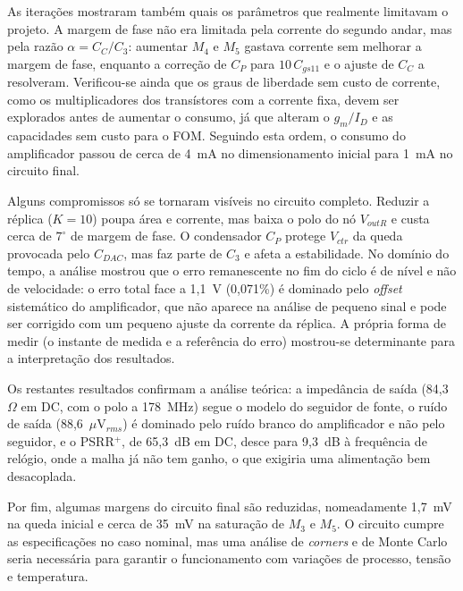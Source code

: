 As iterações mostraram também quais os parâmetros que realmente limitavam o projeto. A margem de fase não era limitada
pela corrente do segundo andar, mas pela razão $\alpha = C_C/C_3$: aumentar $M_4$ e $M_5$ gastava corrente sem melhorar a
margem de fase, enquanto a correção de $C_P$ para $10\,C_{gs11}$ e o ajuste de $C_C$ a resolveram. Verificou-se ainda que
os graus de liberdade sem custo de corrente, como os multiplicadores dos transístores com a corrente fixa, devem ser
explorados antes de aumentar o consumo, já que alteram o $g_m/I_D$ e as capacidades sem custo para o FOM. Seguindo esta
ordem, o consumo do amplificador passou de cerca de 4~mA no dimensionamento inicial para 1~mA no circuito final.

Alguns compromissos só se tornaram visíveis no circuito completo. Reduzir a réplica ($K = 10$) poupa área e corrente, mas
baixa o polo do nó $V_{outR}$ e custa cerca de $7^\circ$ de margem de fase. O condensador $C_P$ protege $V_{ctr}$ da queda
provocada pelo $C_{DAC}$, mas faz parte de $C_3$ e afeta a estabilidade. No domínio do tempo, a análise mostrou que o erro
remanescente no fim do ciclo é de nível e não de velocidade: o erro total face a 1,1~V (0,071\%) é dominado pelo
\textit{offset} sistemático do amplificador, que não aparece na análise de pequeno sinal e pode ser corrigido com um
pequeno ajuste da corrente da réplica. A própria forma de medir (o instante de medida e a referência do erro) mostrou-se
determinante para a interpretação dos resultados.

Os restantes resultados confirmam a análise teórica: a impedância de saída (84,3~$\Omega$ em DC, com o polo a 178~MHz)
segue o modelo do seguidor de fonte, o ruído de saída (88,6~$\mu$V$_{rms}$) é dominado pelo ruído branco do amplificador
e não pelo seguidor, e o PSRR$^+$, de 65,3~dB em DC, desce para 9,3~dB à frequência de relógio, onde a malha já não tem
ganho, o que exigiria uma alimentação bem desacoplada.

Por fim, algumas margens do circuito final são reduzidas, nomeadamente 1,7~mV na queda inicial e cerca de 35~mV na
saturação de $M_3$ e $M_5$. O circuito cumpre as especificações no caso nominal, mas uma análise de \textit{corners} e de
Monte Carlo seria necessária para garantir o funcionamento com variações de processo, tensão e temperatura.